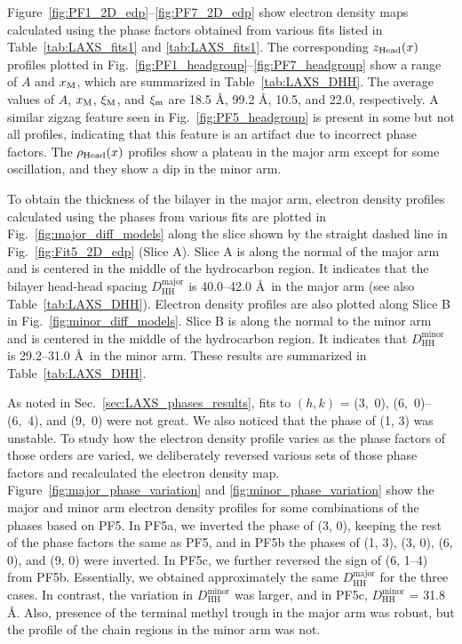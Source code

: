 Figure~\ref{fig:PF1_2D_edp}--\ref{fig:PF7_2D_edp} show electron density maps
calculated using the phase factors obtained from various fits listed in
Table~\ref{tab:LAXS_fits1} and \ref{tab:LAXS_fits1}. 
The corresponding $z_\text{Head}(x)$ profiles plotted in 
Fig.~\ref{fig:PF1_headgroup}--\ref{fig:PF7_headgroup} show a range of $A$ and $x_\textrm{M}$,
which are summarized in Table~\ref{tab:LAXS_DHH}.
The average values of $A$, $x_\textrm{M}$, $\xi_\text{M}$, and $\xi_\text{m}$ are 
18.5 \AA, 99.2 \AA, 10.5\textdegree, and 22.0\textdegree, respectively.
A similar zigzag feature seen in Fig.~\ref{fig:PF5_headgroup} is present
in some but not all profiles, indicating that this feature is an artifact 
due to incorrect phase factors.
The $\rho_\text{Head}(x)$ profiles show a plateau in the major arm except for some
oscillation, and they show a dip in the minor arm.

To obtain the thickness of the bilayer in the major arm, 
electron density profiles calculated
using the phases from various fits are 
plotted in Fig.~\ref{fig:major_diff_models} 
along the slice shown by the straight dashed line in Fig.~\ref{fig:Fit5_2D_edp}
(Slice A).
Slice A is along the normal of the major arm and is centered in the middle of 
the hydrocarbon region. It indicates that the bilayer head-head spacing 
$D_\text{HH}^\text{major}$ is 40.0--42.0 \AA\ in the major arm
(see also Table~\ref{tab:LAXS_DHH}). 
Electron density profiles are also plotted along Slice B
in Fig.~\ref{fig:minor_diff_models}.
Slice B is
along the normal to the minor arm and is centered in the middle of the
hydrocarbon region. It indicates that $D_\text{HH}^\text{minor}$ is
29.2--31.0 \AA\ in the minor arm.
These results are summarized in Table~\ref{tab:LAXS_DHH}.

As noted in Sec.~\ref{sec:LAXS_phases_results}, 
fits to $(h, k)$ = (3,~0), (6,~0)--(6,~4),
and (9,~0) were not great. We also noticed that the phase of (1, 3) was unstable. 
To study how the electron density profile varies as the phase factors of those orders are varied,
we deliberately reversed various sets of those phase factors and recalculated the electron 
density map. Figure~\ref{fig:major_phase_variation}
and \ref{fig:minor_phase_variation} show the major and minor arm electron density
profiles for some combinations of the phases based on PF5. 
In PF5a, we inverted the phase of (3, 0), 
keeping the rest of the phase factors the same as PF5,
and in PF5b the phases of 
(1, 3), (3, 0), (6, 0), and (9, 0) were inverted.
In PF5c, we further reversed the sign of (6, 1--4) from PF5b.
Essentially, we obtained approximately the same $D_\text{HH}^\text{major}$
for the three cases. In contrast, the variation in $D_\text{HH}^\text{minor}$ was
larger, and in PF5c, $D_\text{HH}^\text{minor}$ = 31.8 \AA.
Also, presence of the terminal methyl trough in the major arm was robust, but
the profile of the chain regions in the minor arm was not.


